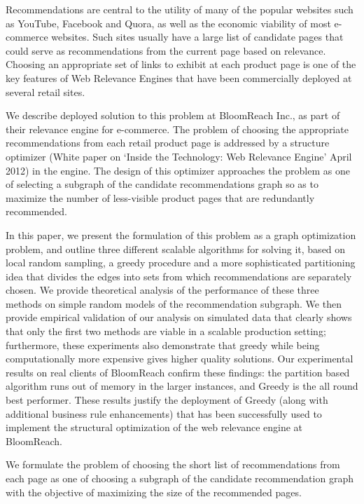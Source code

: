\abstract

Recommendations are central to the utility of many of the popular websites such as YouTube, Facebook and Quora, as well as the economic viability of most e-commerce websites. Such sites usually have a large list of candidate pages that could serve as recommendations from the current page based on relevance. Choosing an appropriate set of links to exhibit at each product page is one of the key features of Web Relevance Engines that have been commercially deployed at several retail sites.

We describe  deployed solution to this problem at BloomReach Inc., as part of their relevance engine for e-commerce. The problem of choosing the appropriate recommendations from each retail product page is addressed by a structure optimizer (White paper on `Inside the Technology: Web Relevance Engine' April 2012) in the engine. The design of this optimizer approaches the problem as one of selecting a subgraph of the candidate recommendations graph so as to maximize the number of less-visible product pages that are redundantly recommended. 

In this paper, we present the formulation of this problem as a graph optimization problem, and outline three different scalable algorithms for solving it, based on local random sampling, a greedy procedure and a more sophisticated partitioning idea that divides the edges into sets from which recommendations are separately chosen. We provide theoretical analysis of the performance of these three methods on simple random models of the recommendation subgraph. We then provide empirical validation of our analysis on simulated data that clearly shows that only the first two methods are viable in a scalable production setting; furthermore, these experiments also demonstrate that greedy while being computationally more expensive gives higher quality solutions. Our experimental results on real clients of BloomReach confirm these findings: the partition based algorithm runs out of memory in the larger instances, and Greedy is the all round best performer. These results justify the deployment of Greedy (along with additional business rule enhancements) that has been successfully used to implement the structural optimization of the web relevance engine at BloomReach.

\iffalse 

We formulate the problem of choosing the short list of recommendations from each page as one of choosing a subgraph of the candidate recommendation graph with the objective of maximizing the size of the recommended pages.

